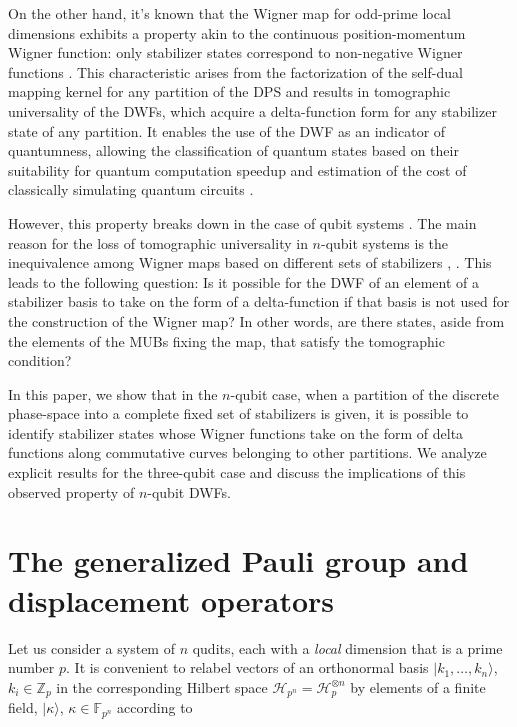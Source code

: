 \documentclass[quantumrep,article,submit,pdftex,moreauthors]{Definitions/mdpi}
\begin{document}
On the other hand, it's known that the Wigner map for odd-prime local
dimensions exhibits a property akin to the continuous position-momentum
Wigner function: only stabilizer states correspond to non-negative Wigner
functions \cite{gross}. This characteristic arises from the factorization of
the self-dual mapping kernel for any partition of the DPS and results in
tomographic universality of the DWFs, which acquire a delta-function form
for any stabilizer state of any partition. It enables the use of the DWF as
an indicator of quantumness, allowing the classification of quantum states
based on their suitability for quantum computation speedup and estimation of
the cost of classically simulating quantum circuits \cite{Raus17,UniqueWF,
cohomo, contextMagic, WignerContext}.

However, this property breaks down in the case of qubit systems \cite{
UniqueWF, cohomo,contextMagic}. The main reason for the loss of tomographic
universality in $n$-qubit systems is the inequivalence among Wigner maps
based on different sets of stabilizers \cite{Bjork2007}, \cite{qip17}. This
leads to the following question: Is it possible for the DWF of an element of
a stabilizer basis to take on the form of a delta-function if that basis is
not used for the construction of the Wigner map? In other words, are there
states, aside from the elements of the MUBs fixing the map, that satisfy the
tomographic condition?

In this paper, we show that in the $n$-qubit case, when a partition of the
discrete phase-space into a complete fixed set of stabilizers is given, it
is possible to identify stabilizer states whose Wigner functions take on the
form of delta functions along commutative curves belonging to other
partitions. We analyze explicit results for the three-qubit case and discuss
the implications of this observed property of $n$-qubit DWFs.

\section{The generalized Pauli group and displacement operators}

Let us consider a system of $n$ qudits, each with a \textit{local} dimension
that is a prime number $p$. It is convenient to relabel vectors of an
orthonormal basis $|k_{1},\ldots ,k_{n}\rangle $, $k_{i}\in \mathbb{Z}_{p}$ in
the corresponding Hilbert space $\mathcal{H}_{p^{n}}=\mathcal{H}_{p}^{\otimes
n}$ by elements of a finite field, $|\kappa \rangle $, $\kappa \in \mathbb{F}%
_{p^{n}}$ according to 
\end{document}

